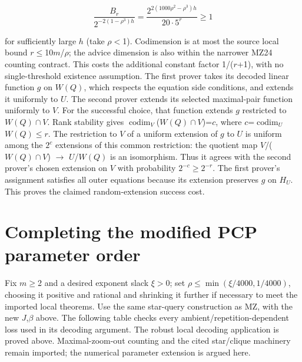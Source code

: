 \begin{equation}\label{eq:18}
\frac{B_r}{2^{-2(1-\rho^3)h}}=\frac{2^{2(1000\rho^2-\rho^3)h}}{20\cdot5^r}\ge1
\end{equation}

for sufficiently large \(h\) (take \(\rho\)\(<\)1). Codimension is at most the source local bound \(r\)\(\le\)10\(m\)/\(\rho\); the advice dimension is also within the narrower MZ24 counting contract. This costs the additional constant factor 1/(\(r\)+1), with no single-threshold existence assumption. The first prover takes its decoded linear function \(g\) on \(W(Q)\), which respects the equation side conditions, and extends it uniformly to \(U\). The second prover extends its selected maximal-pair function uniformly to \(V\). For the successful choice, that function extends \(g\) restricted to \(W(Q)\cap V\). Rank stability gives \(\operatorname{codim}_V\)(\(W(Q)\cap V\))=\(c\), where \(c\)=\(\operatorname{codim}_U\) \(W(Q)\)\(\le\)\(r\). The restriction to \(V\) of a uniform extension of \(g\) to \(U\) is uniform among the \(2^c\) extensions of this common restriction: the quotient map \(V\)/(\(W(Q)\cap V\)) \(\to\) \(U\)/\(W(Q)\) is an isomorphism. Thus it agrees with the second prover's chosen extension on \(V\) with probability \(2^{-c}\)\(\ge\)\(2^{-r}\). The first prover's assignment satisfies all outer equations because its extension preserves \(g\) on \(H_U\). This proves the claimed random-extension success cost.

\section{Completing the modified PCP parameter order}\label{sec:7}
Fix \(m\)\(\ge\)2 and a desired exponent slack \(\xi\)\(>\)0; set \(\rho\)\(\le\)\(\min(\xi/4000,1/4000)\), choosing it positive and rational and shrinking it further if necessary to meet the imported local theorems. Use the same star-query construction as MZ, with the new \(J\),\(\beta\) above. The following table checks every ambient/repetition-dependent loss used in its decoding argument. The robust local decoding application is proved above. Maximal-zoom-out counting and the cited star/clique machinery remain imported; the numerical parameter extension is argued here.

